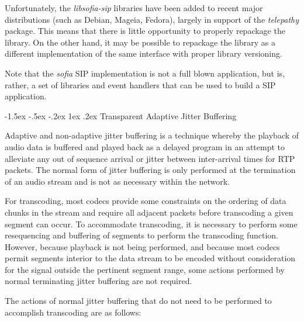 \documentclass[letterpaper,final,notitlepage,twocolumn,10pt,twoside]{article}
\makeatletter
\let\normalsize = \small
\let\small = \footnotesize
\let\footnotesize = \scriptsize
\let\scriptsize = \tiny
\renewcommand\subsection{\@startsection{subsection}{2}{\z@}%
                                     {-1.5ex \@plus -.5ex \@minus -.2ex}%
                                     {1ex \@plus .2ex}%
                                     {\normalfont\normalsize\bfseries}}
\makeatother
\begin{document}
Unfortunately, the {\sl libsofia-sip} libraries have been added to recent
major distributions (such as Debian, Mageia, Fedora), largely in support of
the {\sl telepathy} package.  This means that there is little opportunity to
properly repackage the library.  On the other hand, it may be possible to
repackage the library as a different implementation of the same interface with
proper library versioning.

Note that the {\sl sofia} SIP implementation is not a full blown application,
but is, rather, a set of libraries and event handlers that can be used to
build a SIP application.

\subsection{Transparent Adaptive Jitter Buffering}
\label{section:tajb}

Adaptive and non-adaptive jitter buffering is a technique whereby the playback
of audio data is buffered and played back as a delayed program in an attempt to
alleviate any out of sequence arrival or jitter between inter-arrival times for
RTP packets.  The normal form of jitter buffering is only performed at the
termination of an audio stream and is not as necessary within the network.

For transcoding, most codecs provide some constraints on the ordering of data
chunks in the stream and require all adjacent packets before transcoding a given
segment can occur.  To accommodate transcoding, it is necessary to perform some
resequencing and buffering of segments to perform the transcoding function.
However, because playback is not being performed, and because most codecs permit
segments interior to the data stream to be encoded without consideration for the
signal outside the pertinent segment range, some actions performed by normal
terminating jitter buffering are not required.

The actions of normal jitter buffering that do not need to be performed to
accomplish transcoding are as follows:
\end{document}
